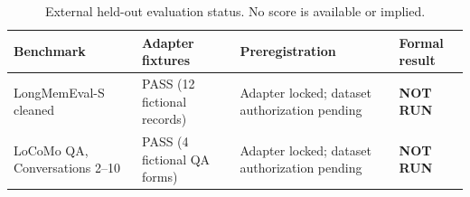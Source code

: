\begin{table}[t]
\centering\small
\caption{External held-out evaluation status. No score is available or implied.}
\label{tab:external-heldout}
\begin{tabularx}{\textwidth}{p{}p{}X p{}}
\toprule
Benchmark & Adapter fixtures & Preregistration & Formal result \\
\midrule
LongMemEval-S cleaned & PASS (12 fictional records) & Adapter locked; dataset authorization pending & \textbf{NOT RUN} \\
LoCoMo QA, Conversations 2--10 & PASS (4 fictional QA forms) & Adapter locked; dataset authorization pending & \textbf{NOT RUN} \\
\bottomrule
\end{tabularx}
\end{table}
